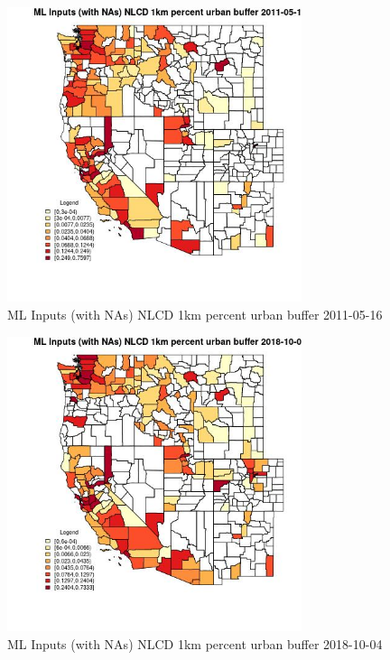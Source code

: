 \begin{figure} 
\centering  
\includegraphics[width=0.77\textwidth]{Code_Outputs/Report_ML_input_PM25_Step4_part_f_de_duplicated_aveswNAs_CountyNLCD_1km_percent_urban_bufferMean2011-05-16.jpg} 
\caption{\label{fig:Report_ML_input_PM25_Step4_part_f_de_duplicated_aveswNAsCountyNLCD_1km_percent_urban_bufferMean2011-05-16}ML Inputs (with NAs) NLCD 1km percent urban buffer 2011-05-16} 
\end{figure} 
 

\begin{figure} 
\centering  
\includegraphics[width=0.77\textwidth]{Code_Outputs/Report_ML_input_PM25_Step4_part_f_de_duplicated_aveswNAs_CountyNLCD_1km_percent_urban_bufferMean2018-10-04.jpg} 
\caption{\label{fig:Report_ML_input_PM25_Step4_part_f_de_duplicated_aveswNAsCountyNLCD_1km_percent_urban_bufferMean2018-10-04}ML Inputs (with NAs) NLCD 1km percent urban buffer 2018-10-04} 
\end{figure} 
 

